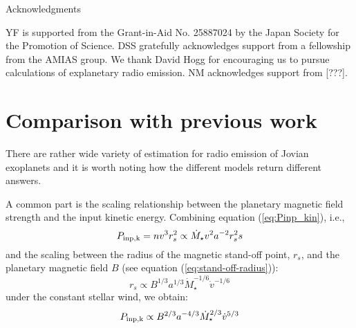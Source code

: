 \documentclass{emulateapj}
\begin{document}

\vspace{0.5in}

\acknowledgements

{\sc Acknowledgments}

YF is supported from the Grant-in-Aid No. 25887024 by the Japan Society for the Promotion of Science.
DSS gratefully acknowledges support from a fellowship from the AMIAS group.
We thank David Hogg for encouraging us to pursue calculations of explanetary radio emission.
NM acknowledges support from [???].




\newpage

\appendix

\section{Comparison with previous work}


There are rather wide variety of estimation for radio emission of Jovian exoplanets and it is worth noting how the different models return different answers. 

A common part is the scaling relationship between the planetary magnetic field strength and the input kinetic energy. Combining equation (\ref{eq:Pinp_kin}), i.e.,
\begin{equation}
P_{\rm inp,k}=nv^3 r_s^2 \propto \dot M_{\star} v^2 a^{-2} r_s^2 s
\end{equation}
and the scaling between the radius of the magnetic stand-off point, $r_s$, and the planetary magnetic field $B$ (see equation (\ref{eq:stand-off-radius})):
\begin{equation}
r_s \propto B^{1/3} a^{1/3} \dot M_{\star }^{-1/6} \dot v^{-1/6}
\end{equation}
under the constant stellar wind, we obtain:
\begin{equation}
P_{\rm inp, k} \propto B^{2/3} a^{-4/3} \dot M_{\star }^{2/3} \dot v^{5/3}
\end{equation}
\end{document}

